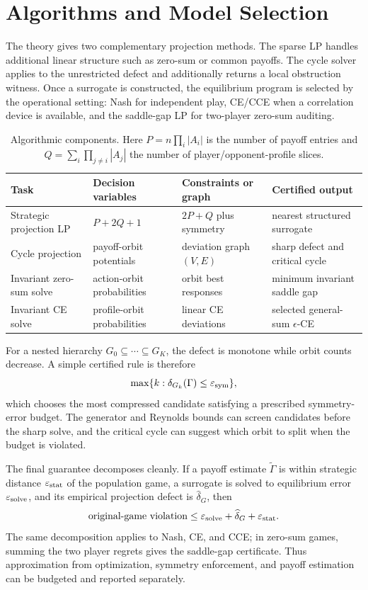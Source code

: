 \section{Algorithms and Model Selection}

The theory gives two complementary projection methods.  The sparse LP handles additional linear structure such as zero-sum or common payoffs.  The cycle solver applies to the unrestricted defect and additionally returns a local obstruction witness.  Once a surrogate is constructed, the equilibrium program is selected by the operational setting: Nash for independent play, CE/CCE when a correlation device is available, and the saddle-gap LP for two-player zero-sum auditing.

\begin{table}[t]
\centering
\begin{tabular}{llll}
\toprule
Task & Decision variables & Constraints or graph & Certified output\\
\midrule
Strategic projection LP & $P+2Q+1$ & $2P+Q$ plus symmetry & nearest structured surrogate\\
Cycle projection & payoff-orbit potentials & deviation graph $(V,E)$ & sharp defect and critical cycle\\
Invariant zero-sum solve & action-orbit probabilities & orbit best responses & minimum invariant saddle gap\\
Invariant CE solve & profile-orbit probabilities & linear CE deviations & selected general-sum $\epsilon$-CE\\
\bottomrule
\end{tabular}
\caption{Algorithmic components.  Here $P=n\prod_i|A_i|$ is the number of payoff entries and $Q=\sum_i\prod_{j\ne i}|A_j|$ the number of player/opponent-profile slices.}
\label{tab:algorithms}
\end{table}

For a nested hierarchy $G_0\subseteq\cdots\subseteq G_K$, the defect is monotone while orbit counts decrease.  A simple certified rule is therefore
\[
\max\{k:\delta_{G_k}(\Gamma)\le\varepsilon_{\rm sym}\},
\]
which chooses the most compressed candidate satisfying a prescribed symmetry-error budget.  The generator and Reynolds bounds can screen candidates before the sharp solve, and the critical cycle can suggest which orbit to split when the budget is violated.

The final guarantee decomposes cleanly.  If a payoff estimate $\widetilde\Gamma$ is within strategic distance $\varepsilon_{\rm stat}$ of the population game, a surrogate is solved to equilibrium error $\varepsilon_{\rm solve}$, and its empirical projection defect is $\widehat\delta_G$, then
\begin{equation}
\text{original-game violation}
\le
\varepsilon_{\rm solve}
+
\widehat\delta_G
+
\varepsilon_{\rm stat}.
\label{eq:error-decomposition}
\end{equation}
The same decomposition applies to Nash, CE, and CCE; in zero-sum games, summing the two player regrets gives the saddle-gap certificate.  Thus approximation from optimization, symmetry enforcement, and payoff estimation can be budgeted and reported separately.
